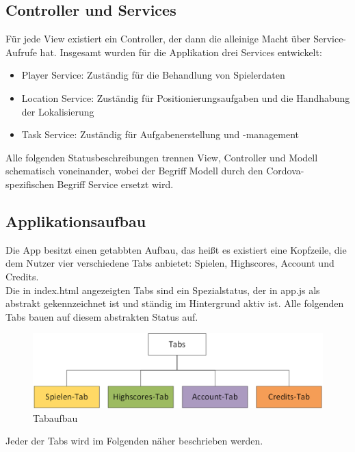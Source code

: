 \subsection{Controller und Services}
Für jede View existiert ein Controller, der dann die alleinige Macht über Service-Aufrufe hat. Insgesamt wurden für die Applikation drei Services entwickelt:
\begin{itemize}
\item Player Service: Zuständig für die Behandlung von Spielerdaten
\item Location Service: Zuständig für Positionierungsaufgaben und die Handhabung der Lokalisierung
\item Task Service: Zuständig für Aufgabenerstellung und -management
\end{itemize}
Alle folgenden Statusbeschreibungen trennen View, Controller und Modell schematisch voneinander, wobei der Begriff Modell durch den Cordova-spezifischen Begriff Service ersetzt wird.
\\
\subsection{Applikationsaufbau}
Die App besitzt einen getabbten Aufbau, das heißt es existiert eine Kopfzeile, die dem Nutzer vier verschiedene Tabs anbietet: Spielen, Highscores, Account und Credits. 
\\
Die in index.html angezeigten Tabs sind ein Spezialstatus, der in app.js als abstrakt gekennzeichnet ist und ständig im Hintergrund aktiv ist. Alle folgenden Tabs bauen auf diesem abstrakten Status auf.
\begin{figure}[h]
\centering
\includegraphics[width=1\textwidth]{ref/images/tabs.png}
\caption[Tabaufbau]{Tabaufbau}
\label{fig:Tabaufbau}
\end{figure}

Jeder der Tabs wird im Folgenden näher beschrieben werden.

